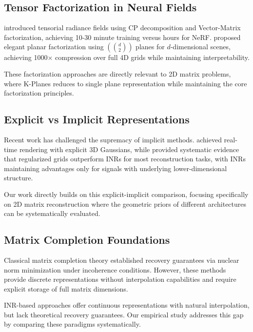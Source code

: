 \documentclass{article}
\begin{document}
\subsection{Tensor Factorization in Neural Fields}

\citet{chen2022tensorf} introduced tensorial radiance fields using CP decomposition and Vector-Matrix factorization, achieving 10-30 minute training versus hours for NeRF. \citet{fridovich2023kplanes} proposed elegant planar factorization using $(d \choose 2)$ planes for $d$-dimensional scenes, achieving 1000× compression over full 4D grids while maintaining interpretability.

These factorization approaches are directly relevant to 2D matrix problems, where K-Planes reduces to single plane representation while maintaining the core factorization principles.

\subsection{Explicit vs Implicit Representations}

Recent work has challenged the supremacy of implicit methods. \citet{kerbl2023gaussian} achieved real-time rendering with explicit 3D Gaussians, while \citet{kim2025grids} provided systematic evidence that regularized grids outperform INRs for most reconstruction tasks, with INRs maintaining advantages only for signals with underlying lower-dimensional structure.

Our work directly builds on this explicit-implicit comparison, focusing specifically on 2D matrix reconstruction where the geometric priors of different architectures can be systematically evaluated.

\subsection{Matrix Completion Foundations}

Classical matrix completion theory \citep{candes2009matrix, recht2011simpler} established recovery guarantees via nuclear norm minimization under incoherence conditions. However, these methods provide discrete representations without interpolation capabilities and require explicit storage of full matrix dimensions.

INR-based approaches offer continuous representations with natural interpolation, but lack theoretical recovery guarantees. Our empirical study addresses this gap by comparing these paradigms systematically.
\end{document}
